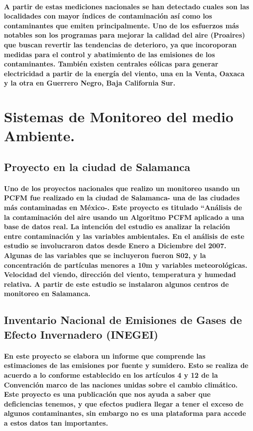 \paragraph {A partir de estas mediciones nacionales se han detectado cuales son las localidades con mayor índices de contaminación así como los contaminantes que emiten principalmente.  Uno de los esfuerzos más notables son los programas para mejorar la calidad del aire (Proaires) que buscan revertir las tendencias de deterioro, ya que incoroporan medidas para el control y abatimiento de las emisiones de los contaminantes.  También existen centrales eólicas para generar electricidad a partir de la energía del viento, una en la Venta, Oaxaca y la otra en Guerrero Negro, Baja California Sur. }
\section {Sistemas de Monitoreo del medio Ambiente.}
\subsection {Proyecto en la ciudad de Salamanca}
\paragraph {Uno de los proyectos nacionales que realizo un monitoreo usando un PCFM fue realizado en la ciudad de Salamanca- una de las ciudades más contaminadas en México-.  Este proyecto es titulado “Análisis de la contaminación del aire usando un Algoritmo PCFM  aplicado a una base de datos real. La intención del estudio es analizar la relación entre contaminación y las variables ambientales. En el análisis de este estudio se involucraron datos desde Enero a Diciembre del 2007. Algunas de las variables que se incluyeron fueron S02, y la concentración de partículas menores a 10m y variables meteorológicas. Velocidad del viendo, dirección del viento, temperatura y humedad relativa. A partir de este estudio se instalaron algunos centros de monitoreo en Salamanca.}
\subsection {Inventario Nacional de Emisiones de Gases de Efecto Invernadero (INEGEI)}
\paragraph {En este proyecto se elabora un informe que comprende las estimaciones de las emisiones por fuente y sumidero. Esto se realiza de acuerdo a lo conforme establecido en los artículos 4 y 12 de la Convención marco de las naciones unidas sobre el cambio climático. Este proyecto es una publicación que nos ayuda a saber que deficiencias tenemos, y que efectos pudiera llegar a tener el exceso de algunos contaminantes, sin embargo no es una plataforma para accede a estos datos tan importantes.}
